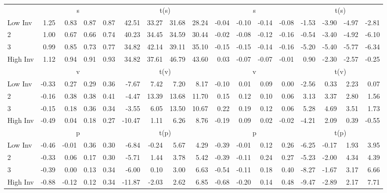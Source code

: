 \begin{table}[!ht]
\begin{tabular}{lrrrrrrrrrrrrrrrr}
  
     & \multicolumn{4}{c}{s} & \multicolumn{4}{c}{t(s)}  & \multicolumn{4}{c}{s} & \multicolumn{4}{c}{t(s)}   \\
     \cmidrule(r){2-5} \cmidrule(r){6-9}  \cmidrule(r){10-13} \cmidrule(r){14-17} 
    Low Inv  & 1.25  & 0.83  & 0.87  & 0.87  & 42.51  & 33.27  & 31.68  & 28.24  & -0.04  & -0.10  & -0.14  & -0.08  & -1.53  & -3.90  & -4.97  & -2.81   \\
    2  & 1.00  & 0.67  & 0.66  & 0.74  & 40.23  & 34.45  & 34.59  & 30.44  & -0.02  & -0.08  & -0.12  & -0.16  & -0.54  & -3.40  & -4.92  & -6.10   \\
    3  & 0.99  & 0.85  & 0.73  & 0.77  & 34.82  & 42.14  & 39.11  & 35.10  & -0.15  & -0.15  & -0.14  & -0.16  & -5.20  & -5.40  & -5.77  & -6.34   \\
    High Inv  & 1.12  & 0.94  & 0.91  & 0.93  & 34.82  & 37.61  & 46.79  & 43.60  & 0.03  & -0.07  & -0.07  & -0.01  & 0.90  & -2.30  & -2.57  & -0.25   \\
    
  
     & \multicolumn{4}{c}{v} & \multicolumn{4}{c}{t(v)}  & \multicolumn{4}{c}{v} & \multicolumn{4}{c}{t(v)}   \\
     \cmidrule(r){2-5} \cmidrule(r){6-9}  \cmidrule(r){10-13} \cmidrule(r){14-17} 
    Low Inv  & -0.33  & 0.27  & 0.29  & 0.36  & -7.67  & 7.42  & 7.20  & 8.17  & -0.10  & 0.01  & 0.09  & 0.00  & -2.56  & 0.33  & 2.23  & 0.07   \\
    2  & -0.16  & 0.38  & 0.38  & 0.41  & -4.47  & 13.39  & 13.68  & 11.70  & 0.15  & 0.12  & 0.10  & 0.06  & 3.13  & 3.37  & 2.80  & 1.56   \\
    3  & -0.15  & 0.18  & 0.36  & 0.34  & -3.55  & 6.05  & 13.50  & 10.67  & 0.22  & 0.19  & 0.12  & 0.06  & 5.28  & 4.69  & 3.51  & 1.73   \\
    High Inv  & -0.49  & 0.04  & 0.18  & 0.27  & -10.47  & 1.11  & 6.26  & 8.76  & -0.19  & 0.09  & 0.02  & -0.02  & -4.21  & 2.09  & 0.39  & -0.55   \\
    
  
     & \multicolumn{4}{c}{p} & \multicolumn{4}{c}{t(p)}  & \multicolumn{4}{c}{p} & \multicolumn{4}{c}{t(p)}   \\
     \cmidrule(r){2-5} \cmidrule(r){6-9}  \cmidrule(r){10-13} \cmidrule(r){14-17} 
    Low Inv  & -0.46  & -0.01  & 0.36  & 0.30  & -6.84  & -0.24  & 5.67  & 4.29  & -0.39  & -0.01  & 0.12  & 0.26  & -6.25  & -0.17  & 1.93  & 3.95   \\
    2  & -0.33  & 0.06  & 0.17  & 0.30  & -5.71  & 1.44  & 3.78  & 5.42  & -0.39  & -0.11  & 0.24  & 0.27  & -5.23  & -2.00  & 4.34  & 4.39   \\
    3  & -0.39  & 0.00  & 0.13  & 0.34  & -6.00  & 0.10  & 3.00  & 6.63  & -0.54  & -0.11  & 0.18  & 0.40  & -8.27  & -1.67  & 3.17  & 6.66   \\
    High Inv  & -0.88  & -0.12  & 0.12  & 0.34  & -11.87  & -2.03  & 2.62  & 6.85  & -0.68  & -0.20  & 0.14  & 0.48  & -9.47  & -2.89  & 2.17  & 7.71   \\
    

\end{tabular}
\end{table}
